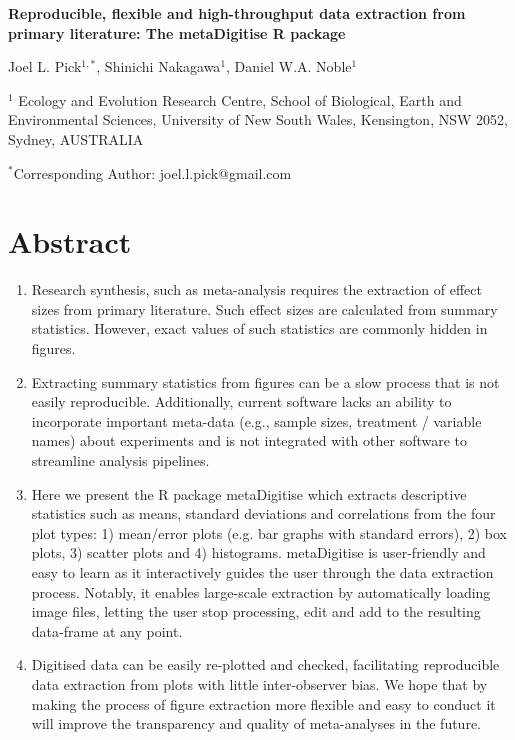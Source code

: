 \documentclass[12pt]{article}
\newcommand{\pkg}[1]{{\fontseries{b}\selectfont #1}}
\let\proglang=\textsf
\begin{document}
\newenvironment{CodeChunk}{}{}

\raggedright


\textbf{Reproducible, flexible and high-throughput data extraction from primary literature: The \pkg{metaDigitise} \proglang{R} package}

Joel L. Pick$^{1,*}$, Shinichi Nakagawa$^1$, Daniel W.A. Noble$^1$

$^1$
  Ecology and Evolution Research Centre, School of Biological, Earth and Environmental Sciences,  University of New South Wales, Kensington, NSW 2052, Sydney, AUSTRALIA

 $^*$Corresponding Author: joel.l.pick@gmail.com\\


\clearpage
\section*{Abstract}
\begin{enumerate} 
\item Research synthesis, such as meta-analysis requires the extraction of effect sizes from primary literature. Such effect sizes are calculated from summary statistics. However, exact values of such statistics are commonly hidden in figures. 

\item Extracting summary statistics from figures can be a slow process that is not easily reproducible. Additionally, current software lacks an ability to incorporate important meta-data (e.g., sample sizes, treatment / variable names) about experiments and is not integrated with other software to streamline analysis pipelines.

\item Here we present the R package \pkg{metaDigitise} which extracts descriptive statistics such as means, standard deviations and correlations from the four plot types: 1) mean/error plots (e.g. bar graphs with standard errors), 2) box plots, 3) scatter plots and 4) histograms. \pkg{metaDigitise} is user-friendly and easy to learn as it interactively guides the user through the data extraction process. Notably, it enables large-scale extraction by automatically loading image files, letting the user stop processing, edit and add to the resulting data-frame at any point. 

\item Digitised data can be easily re-plotted and checked, facilitating reproducible data extraction from plots with little inter-observer bias. We hope that by making the process of figure extraction more flexible and easy to conduct it will improve the transparency and quality of meta-analyses in the future.
\end{enumerate}
\end{document}
